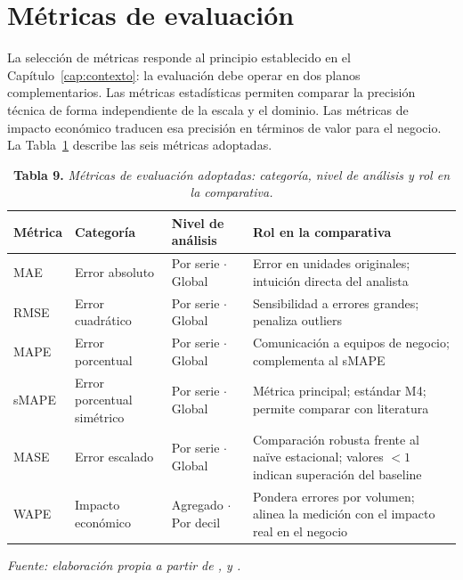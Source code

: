 \section{Métricas de evaluación}
\label{sec:metricas_evaluacion}

La selección de métricas responde al principio establecido en el Capítulo~\ref{cap:contexto}: la evaluación debe operar en dos planos complementarios. Las métricas estadísticas permiten comparar la precisión técnica de forma independiente de la escala y el dominio. Las métricas de impacto económico traducen esa precisión en términos de valor para el negocio. La Tabla~\ref{tab:metricas_seleccion} describe las seis métricas adoptadas.

\begin{table}[H]
\caption{\textbf{Tabla 9.} \textit{Métricas de evaluación adoptadas: categoría, nivel de análisis y rol en la comparativa.}}
\label{tab:metricas_seleccion}
\vspace{4pt}
\begin{tabular}{>{\raggedright\arraybackslash}p{2.5cm} >{\raggedright\arraybackslash}p{2.8cm} >{\raggedright\arraybackslash}p{2.5cm} >{\raggedright\arraybackslash}p{5.5cm}}
\toprule
\textbf{Métrica} & \textbf{Categoría} & \textbf{Nivel de análisis} & \textbf{Rol en la comparativa} \\
\midrule
MAE & Error absoluto & Por serie $\cdot$ Global & Error en unidades originales; intuición directa del analista \\
RMSE & Error cuadrático & Por serie $\cdot$ Global & Sensibilidad a errores grandes; penaliza outliers \\
MAPE & Error porcentual & Por serie $\cdot$ Global & Comunicación a equipos de negocio; complementa al sMAPE \\
sMAPE & Error porcentual simétrico & Por serie $\cdot$ Global & Métrica principal; estándar M4; permite comparar con literatura \parencite{Petropoulos2022} \\
MASE & Error escalado & Por serie $\cdot$ Global & Comparación robusta frente al naïve estacional; valores $<1$ indican superación del baseline \parencite{Hyndman2021} \\
WAPE & Impacto económico & Agregado $\cdot$ Por decil & Pondera errores por volumen; alinea la medición con el impacto real en el negocio \parencite{Makridakis2022} \\
\bottomrule
\end{tabular}
\vspace{4pt}

\small\textit{Fuente: elaboración propia a partir de \textcite{Petropoulos2022}, \textcite{Hyndman2021} y \textcite{Makridakis2022}.}
\end{table}

